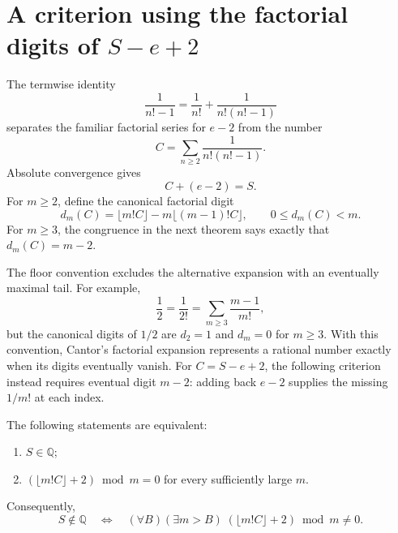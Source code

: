 \documentclass[11pt]{article}
\newcommand{\Ser}{S}
\begin{document}
\appendix
\section{A criterion using the factorial digits of \texorpdfstring{$S-e+2$}{S-e+2}}\label{sec:companion-orbit}

The termwise identity
\[
\frac1{n!-1}=\frac1{n!}+\frac1{n!(n!-1)}
\]
separates the familiar factorial series for $e-2$ from the number
\[
C=\sum_{n\ge2}\frac1{n!(n!-1)}.
\]
Absolute convergence gives
\begin{equation}C+(e-2)=\Ser.\label{eq:companion-decomposition}\end{equation}
For $m\ge2$, define the canonical factorial digit
\[
 d_m(C)=\lfloor m!C\rfloor-m\lfloor(m-1)!C\rfloor,
 \qquad 0\le d_m(C)<m.
\]
For $m\ge3$, the congruence in the next theorem says exactly that
$d_m(C)=m-2$.

The floor convention excludes the alternative expansion with an eventually
maximal tail. For example,
\[
 \frac12=\frac1{2!}=\sum_{m\ge3}\frac{m-1}{m!},
\]
but the canonical digits of $1/2$ are $d_2=1$ and $d_m=0$ for $m\ge3$.
With this convention, Cantor's factorial expansion \cite{cantor1869}
represents a rational number exactly when its digits eventually vanish.
For $C=S-e+2$, the following criterion instead requires eventual digit
$m-2$: adding back $e-2$ supplies the missing $1/m!$ at each index.

\begin{theorem}
\label{res:companion-orbit-rationality-boundary}
The following statements are equivalent:
\begin{enumerate}
\item $\Ser\in\mathbb Q$;
\item $(\lfloor m!C\rfloor+2)\bmod m=0$ for every sufficiently large $m$.
\end{enumerate}
Consequently,
\begin{equation}
 \Ser\notin\mathbb Q
 \quad\Longleftrightarrow\quad
 (\forall B)(\exists m>B)\;
   (\lfloor m!C\rfloor+2)\bmod m\ne0 .
 \label{eq:companion-cofinal}
\end{equation}
\end{theorem}
\end{document}

